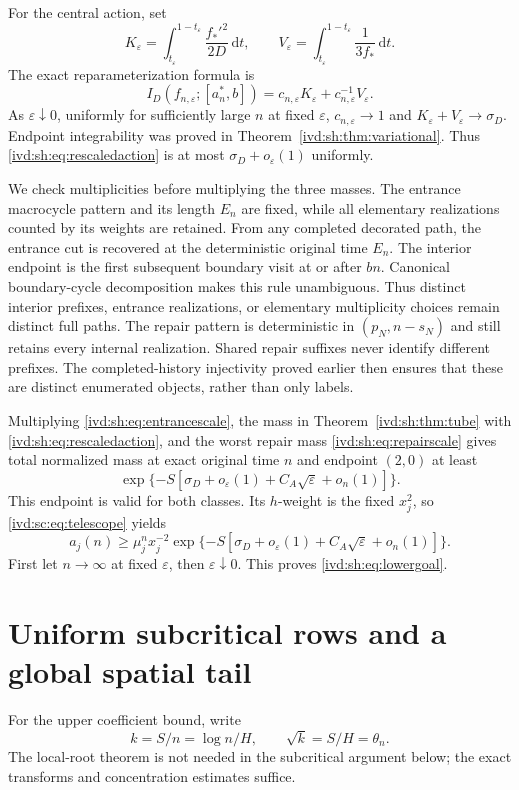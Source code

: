 \documentclass[11pt,letterpaper]{article}
\theoremstyle{remark}\newtheorem{remark}[theorem]{Remark}
\numberwithin{equation}{section}
\newcommand{\dd}{\,\mathrm d}
\begin{document}
For the central action, set
\[
 K_\varepsilon=\int_{t_\varepsilon}^{1-t_\varepsilon}
                  \frac{f_*'^2}{2D}\dd t,\qquad
 V_\varepsilon=\int_{t_\varepsilon}^{1-t_\varepsilon}
                  \frac1{3f_*}\dd t.
\]
The exact reparameterization formula is
\begin{equation}\label{ivd:sh:eq:rescaledaction}
 I_D(f_{n,\varepsilon};[a_n^*,b])
  =c_{n,\varepsilon}K_\varepsilon
     +c_{n,\varepsilon}^{-1}V_\varepsilon.
\end{equation}
As $\varepsilon\downarrow0$, uniformly for sufficiently large $n$
at fixed $\varepsilon$, $c_{n,\varepsilon}\to1$ and
$K_\varepsilon+V_\varepsilon\to\sigma_D$. Endpoint integrability
was proved in Theorem~\ref{ivd:sh:thm:variational}.
Thus \eqref{ivd:sh:eq:rescaledaction} is at most
$\sigma_D+o_\varepsilon(1)$ uniformly.

We check multiplicities before multiplying the three masses.
The entrance macrocycle pattern and its length $E_n$ are fixed,
while all elementary realizations counted by its weights are retained.
From any completed decorated path, the entrance cut is recovered at
the deterministic original time $E_n$. The interior endpoint is the
first subsequent boundary visit at or after $bn$.
Canonical boundary-cycle decomposition makes this rule unambiguous.
Thus distinct interior prefixes, entrance realizations, or elementary
multiplicity choices remain distinct full paths. The repair pattern
is deterministic in $(p_N,n-s_N)$ and still retains every internal
realization. Shared repair suffixes never identify different prefixes.
The completed-history injectivity proved earlier then ensures that
these are distinct enumerated objects, rather than only labels.

Multiplying \eqref{ivd:sh:eq:entrancescale}, the mass in
Theorem~\ref{ivd:sh:thm:tube} with \eqref{ivd:sh:eq:rescaledaction}, and the worst
repair mass \eqref{ivd:sh:eq:repairscale} gives total normalized mass at
exact original time $n$ and endpoint $(2,0)$ at least
\[
 \exp\{-S[\sigma_D+o_\varepsilon(1)+C_A\sqrt\varepsilon+o_n(1)]\}.
\]
This endpoint is valid for both classes. Its $h$-weight is the fixed
$x_j^2$, so \eqref{ivd:sc:eq:telescope} yields
\[
 a_j(n)\ge\mu_j^n x_j^{-2}
  \exp\{-S[\sigma_D+o_\varepsilon(1)+C_A\sqrt\varepsilon+o_n(1)]\}.
\]
First let $n\to\infty$ at fixed $\varepsilon$, then
$\varepsilon\downarrow0$. This proves \eqref{ivd:sh:eq:lowergoal}.
\section{Uniform subcritical rows and a global spatial tail}\label{ivd:sh:sec:tails}
For the upper coefficient bound, write
\[
 k=S/n=\log n/H,\qquad\sqrt k=S/H=\theta_n.
\]
The local-root theorem is not needed in the subcritical argument below;
the exact transforms and concentration estimates suffice.
\end{document}

